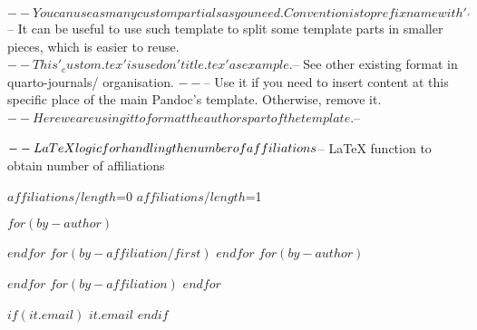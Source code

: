 $-- You can use as many custom partials as you need. Convention is to prefix name with '_'
$-- It can be useful to use such template to split some template parts in smaller pieces, which is easier to reuse.
$-- This '_custom.tex' is used on 'title.tex' as example.
$-- See other existing format in quarto-journals/ organisation.
$-- %
$-- Use it if you need to insert content at this specific place of the main Pandoc's template. Otherwise, remove it.
$-- Here we are using it to format the authors part of the template.
$-- %

$-- LaTeX logic for handling the number of affiliations
\newif\ifnoAffil\noAffilfalse
\newif\ifoneAffil\oneAffilfalse

$-- LaTeX function to obtain number of affiliations
\newcommand{\setNumAffil}[1]{%
    \ifnum#1=0
        \noAffiltrue
    \else
        \ifnum#1=1
            \oneAffiltrue
        \fi
    \fi
}

\setNumAffil{$affiliations/length$}

\ifnoAffil
\author{$for(by-author)$$it.name.literal$$sep$, $endfor$}
\else
\ifoneAffil
$for(by-author)$
\author{$it.name.literal$$if(it.orcid)$~$endif$}
$endfor$
$for(by-affiliation/first)$
$endfor$
\else
$for(by-author)$
\author[$for(it.affiliations)$$it.number$$sep$,$endfor$]{$it.name.literal$$if(it.orcid)$~$endif$}
$endfor$
$for(by-affiliation)$
$endfor$
\fi
\fi

$if(it.email)$
\normalsize\href{mailto:$it.email$}{$it.email$}
$endif$
